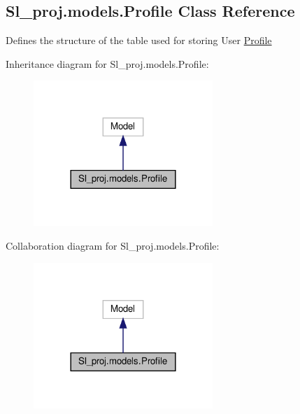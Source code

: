 \hypertarget{classSl__proj_1_1models_1_1Profile}{}\subsection{Sl\+\_\+proj.\+models.\+Profile Class Reference}
\label{classSl__proj_1_1models_1_1Profile}


Defines the structure of the table used for storing User \hyperlink{classSl__proj_1_1models_1_1Profile}{Profile}  




Inheritance diagram for Sl\+\_\+proj.\+models.\+Profile\+:\nopagebreak
\begin{figure}[H]
\begin{center}
\leavevmode
\includegraphics[width=192pt]{classSl__proj_1_1models_1_1Profile__inherit__graph}
\end{center}
\end{figure}


Collaboration diagram for Sl\+\_\+proj.\+models.\+Profile\+:\nopagebreak
\begin{figure}[H]
\begin{center}
\leavevmode
\includegraphics[width=192pt]{classSl__proj_1_1models_1_1Profile__coll__graph}
\end{center}
\end{figure}
